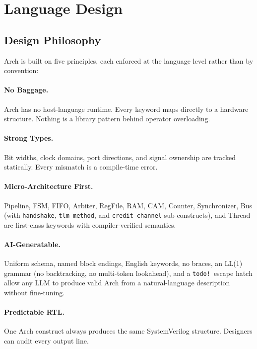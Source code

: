 \documentclass[11pt,twocolumn]{article}
\begin{document}
\section{Language Design}\label{sec:design}

\subsection{Design Philosophy}

Arch is built on five principles, each enforced at the language level rather than by convention:

\paragraph{No Baggage.} Arch has no host-language runtime. Every keyword maps directly to a hardware structure. Nothing is a library pattern behind operator overloading.

\paragraph{Strong Types.} Bit widths, clock domains, port directions, and signal ownership are tracked statically. Every mismatch is a compile-time error.

\paragraph{Micro-Architecture First.} Pipeline, FSM, FIFO, Arbiter, RegFile, RAM, CAM, Counter, Synchronizer, Bus (with \texttt{handshake}, \texttt{tlm\_method}, and \texttt{credit\_channel} sub-constructs), and Thread are first-class keywords with compiler-verified semantics.

\paragraph{AI-Generatable.} Uniform schema, named block endings, English keywords, no braces, an LL(1) grammar (no backtracking, no multi-token lookahead), and a \texttt{todo!}\ escape hatch allow any LLM to produce valid Arch from a natural-language description without fine-tuning.

\paragraph{Predictable RTL.} One Arch construct always produces the same SystemVerilog structure. Designers can audit every output line.
\end{document}
